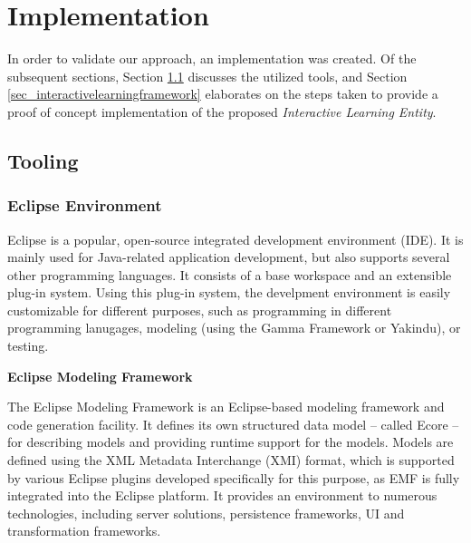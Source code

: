\chapter{Implementation}

In order to validate our approach, an implementation was created. Of the subsequent sections, Section \ref{sec_tooling} discusses the utilized tools, and Section \ref{sec_interactivelearningframework} elaborates on the steps taken to provide a proof of concept implementation of the proposed \textit{Interactive Learning Entity}.
\section{Tooling} \label{sec_tooling}

\subsection{Eclipse Environment} \label{subsec_emf}
Eclipse is a popular, open-source integrated development environment (IDE). It is mainly used for Java-related application development, but also supports several other programming languages. It consists of a base workspace and an extensible plug-in system. Using this plug-in system, the develpment environment is easily customizable for different purposes, such as programming in different programming lanugages, modeling (using the Gamma Framework or Yakindu), or testing.

\textbf{Eclipse Modeling Framework}

The Eclipse Modeling Framework is an Eclipse-based modeling framework and code generation facility. It defines its own structured data model -- called Ecore -- for describing models and providing runtime support for the models. Models are defined using the XML Metadata Interchange (XMI) format, which is supported by various Eclipse plugins developed specifically for this purpose, as EMF is fully integrated into the Eclipse platform. It provides an environment to numerous technologies, including server solutions, persistence frameworks, UI and transformation frameworks.

